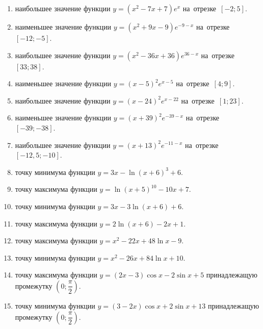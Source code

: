 \documentclass[a4paper,10pt]{article}
\begin{document}
\begin{enumerate}
\item {} наибольшее значение функции $y=\left(x^2 -7x +7\right)e^{x}$ на~отрезке~$\left[-2;5\right]$.

\item {} наименьшее значение функции $y=\left(x^2 +9x -9\right)e^{-9-x}$ на~отрезке~$\left[-12;-5\right]$.

\item {} наибольшее значение функции $y=\left(x^2 -36x +36\right)e^{36-x}$ на~отрезке~$\left[33;38\right]$.

\item {} наименьшее значение функции $y=\left(x-5\right)^2e^{x-5}$ на~отрезке~$\left[4;9\right]$.

\item {} наибольшее значение функции $y=\left(x-24\right)^2e^{x-22}$ на~отрезке~$\left[1;23\right]$.

\item {} наименьшее значение функции $y=\left(x+39\right)^2e^{-39-x}$ на~отрезке~$\left[-39;-38\right]$.

\item {} наибольшее значение функции $y=\left(x+13\right)^2e^{-11-x}$ на~отрезке~$\left[-12,5;-10\right]$.

\item {} точку минимума функции $y=3x-\ln\left(x+6\right)^{3}+6$.

\item {} точку максимума функции $y=\ln\left(x+5\right)^{10}-10x+7$.

\item {} точку минимума функции $y=3x-3\ln\left(x+6\right)+6$.

\item {} точку максимума функции $y=2\ln\left(x+6\right)-2x+1$.

\item {} точку максимума функции $y=x^2-22x+48\ln x -9$.

\item {} точку минимума функции $y=x^2-26x+84\ln x +10$.

\item {} точку максимума функции $y=\left(2x-3\right)\cos x -2\sin x+5$
принадлежащую промежутку $\left(0;\dfrac{\pi}{2}\right)$.

\item {} точку минимума функции $y=\left(3-2x\right)\cos x +2\sin x+13$
принадлежащую промежутку $\left(0;\dfrac{\pi}{2}\right)$.


\end{enumerate}
\end{document}
